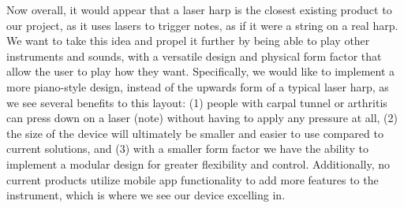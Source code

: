 Now overall, it would appear that a laser harp is the closest existing product to our project, as it uses lasers to trigger notes, as if it were a string on a real harp. We want to take this idea and propel it further by being able to play other instruments and sounds, with a versatile design and physical form factor that allow the user to play how they want. Specifically, we would like to implement a more piano-style design, instead of the upwards form of a typical laser harp, as we see several benefits to this layout: (1) people with carpal tunnel or arthritis can press down on a laser (note) without having to apply any pressure at all, (2) the size of the device will ultimately be smaller and easier to use compared to current solutions, and (3) with a smaller form factor we have the ability to implement a modular design for greater flexibility and control. Additionally, no current products utilize mobile app functionality to add more features to the instrument, which is where we see our device excelling in.
